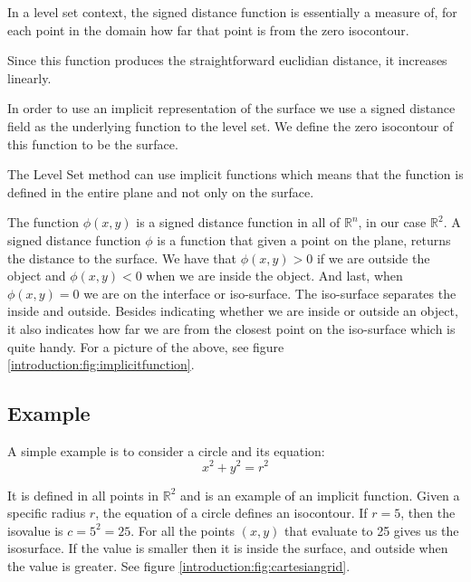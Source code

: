 In a level set context, the signed distance function is essentially a
measure of, for each point in the domain how far that point is from
the zero isocontour.

Since this function produces the straightforward euclidian distance,
it increases linearly. 

In order to use an implicit representation of the surface we use a
signed distance field as the underlying function to the level set. We
define the zero isocontour of this function to be the surface.

The Level Set method can use implicit functions which means that the
function is defined in the entire plane and not only on the surface.

The function $\phi(x,y)$ is a signed distance function in all of
$\mathbb{R}^{n}$, in our case $\mathbb{R}^{2}$. A signed distance
function $\phi$ is a function that given a point on the plane, returns
the distance to the surface. We have that $\phi(x,y) > 0$ if we are
outside the object and $\phi(x,y) < 0$ when we are inside the object.
And last, when $\phi(x,y) = 0$ we are on the interface or iso-surface.
The iso-surface separates the inside and outside.  Besides indicating
whether we are inside or outside an object, it also indicates how far
we are from the closest point on the iso-surface which is quite
handy. For a picture of the above, see figure
\vref{introduction:fig:implicitfunction}.



\subsection*{Example}

A simple example is to consider a circle and its equation:
\begin{equation*} 
  x^{2} + y^{2} = r^{2}
\end{equation*}

It is defined in all points in $\mathbb{R}^{2}$ and is an example of
an implicit function. Given a specific radius $r$, the equation of a
circle defines an isocontour. If $r = 5$, then the isovalue is $c =
5^{2} = 25$. For all the points $(x,y)$ that evaluate to 25 gives us
the isosurface. If the value is smaller then it is inside the surface,
and outside when the value is greater. See figure
\vref{introduction:fig:cartesiangrid}.


